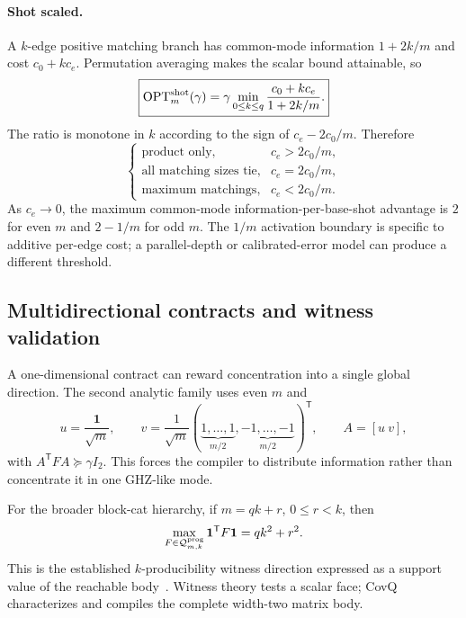 \documentclass[11pt]{article}
\theoremstyle{definition}
\theoremstyle{remark}
\newcommand{\Q}{\mathcal{Q}}
\newcommand{\ones}{\mathbf{1}}
\newcommand{\OPT}{\operatorname{OPT}}
\begin{document}
\paragraph{Shot scaled.}
A $k$-edge positive matching branch has common-mode information $1+2k/m$ and cost $c_0+kc_e$. Permutation averaging makes the scalar bound attainable, so
\begin{equation}
\boxed{
\OPT^{\rm shot}_m(\gamma)
=\gamma\min_{0\le k\le q}
\frac{c_0+kc_e}{1+2k/m}.}
\label{eq:common-mode-shot-opt}
\end{equation}
The ratio is monotone in $k$ according to the sign of $c_e-2c_0/m$. Therefore
\begin{equation}
\begin{cases}
\text{product only},&c_e>2c_0/m,\\
\text{all matching sizes tie},&c_e=2c_0/m,\\
\text{maximum matchings},&c_e<2c_0/m.
\end{cases}
\label{eq:common-mode-activation-threshold}
\end{equation}
As $c_e\to0$, the maximum common-mode information-per-base-shot advantage is $2$ for even $m$ and $2-1/m$ for odd $m$. The $1/m$ activation boundary is specific to additive per-edge cost; a parallel-depth or calibrated-error model can produce a different threshold.

\subsection{Multidirectional contracts and witness validation}
A one-dimensional contract can reward concentration into a single global direction. The second analytic family uses even $m$ and
\begin{equation}
  u=\frac{\ones}{\sqrt m},\qquad
  v=\frac{1}{\sqrt m}(\underbrace{1,\ldots,1}_{m/2},
  \underbrace{-1,\ldots,-1}_{m/2})^{\mathsf T},\qquad A=[u\ v],
  \label{eq:two-mode-A}
\end{equation}
with $A^{\mathsf T}FA\succeq\gamma I_2$. This forces the compiler to distribute information rather than concentrate it in one GHZ-like mode.

For the broader block-cat hierarchy, if $m=qk+r$, $0\le r<k$, then
\begin{equation}
  \max_{F\in\Q^{\rm prog}_{m,k}}\ones^{\mathsf T}F\ones=qk^2+r^2.
  \label{eq:k-support}
\end{equation}
This is the established $k$-producibility witness direction expressed as a support value of the reachable body~\cite{HyllusEtAl2012,Toth2012}. Witness theory tests a scalar face; CovQ characterizes and compiles the complete width-two matrix body.
\end{document}
